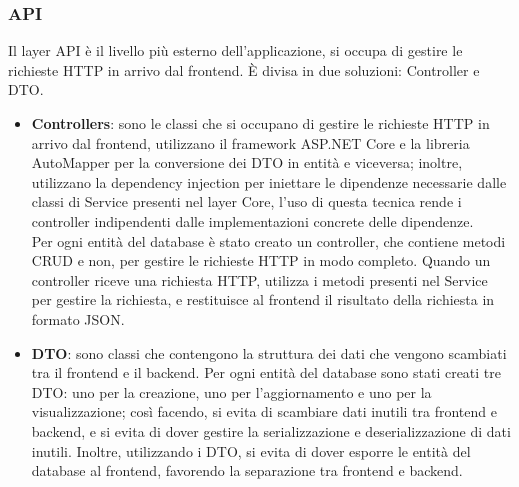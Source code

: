 \subsubsection{API}
Il layer API è il livello più esterno dell'applicazione, si occupa di gestire le richieste HTTP in arrivo dal frontend. È divisa in due soluzioni: Controller e DTO.\\
\begin{itemize}
    \item \textbf{Controllers}: sono le classi che si occupano di gestire le richieste HTTP in arrivo dal frontend, utilizzano il framework ASP.NET Core e la libreria AutoMapper per la conversione dei DTO in entità e viceversa; inoltre, utilizzano la dependency injection per iniettare le dipendenze necessarie dalle classi di Service presenti nel layer Core, l'uso di questa tecnica rende i controller indipendenti dalle implementazioni concrete delle dipendenze.\\
    Per ogni entità del database è stato creato un controller, che contiene metodi CRUD e non, per gestire le richieste HTTP in modo completo. Quando un controller riceve una richiesta HTTP, utilizza i metodi presenti nel Service per gestire la richiesta, e restituisce al frontend il risultato della richiesta in formato JSON.\\
    \item \textbf{DTO}: sono classi che contengono la struttura dei dati che vengono scambiati tra il frontend e il backend.
    Per ogni entità del database sono stati creati tre DTO: uno per la creazione, uno per l'aggiornamento e uno per la visualizzazione; così facendo, si evita di scambiare dati inutili tra frontend e backend, e si evita di dover gestire la serializzazione e deserializzazione di dati inutili. Inoltre, utilizzando i DTO, si evita di dover esporre le entità del database al frontend, favorendo la separazione tra frontend e backend.\\
\end{itemize}
